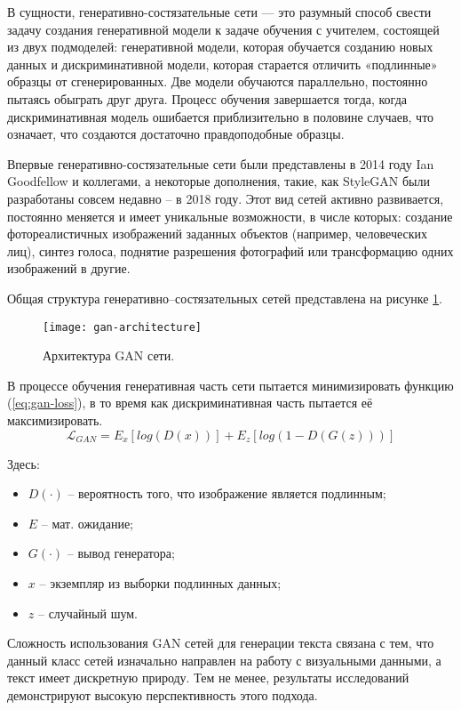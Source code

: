 В сущности, генеративно-состязательные сети --- это разумный способ свести задачу создания генеративной модели к задаче обучения с учителем, состоящей из двух подмоделей: генеративной модели, которая обучается созданию новых данных и дискриминативной модели, которая старается отличить «подлинные» образцы от сгенерированных. Две модели обучаются параллельно, постоянно пытаясь обыграть друг друга. Процесс обучения завершается тогда, когда дискриминативная модель ошибается приблизительно в половине случаев, что означает, что создаются достаточно правдоподобные образцы.

Впервые генеративно-состязательные сети были представлены в 2014 году Ian Goodfellow и коллегами\cite{gan-introduction}, а некоторые дополнения, такие, как StyleGAN были разработаны совсем недавно -- в 2018 году\cite{gan-stylegan}. Этот вид сетей активно развивается, постоянно меняется и имеет уникальные возможности, в числе которых: создание фотореалистичных изображений заданных объектов (например, человеческих лиц), синтез голоса, поднятие разрешения фотографий\cite{gan-upscaling} или трансформацию одних изображений в другие.

Общая структура генеративно--состязательных сетей представлена на рисунке \ref{fig:gan-architecture}.
\begin{figure}[h]
	\centering
	\texttt{[image: gan-architecture]}
	\caption{Архитектура GAN сети.}
	\label{fig:gan-architecture}
\end{figure}

В процессе обучения генеративная часть сети пытается минимизировать функцию (\ref{eq:gan-loss}), в то время как дискриминативная часть пытается её максимизировать. 
\begin{equation}
\label{eq:gan-loss}
\mathcal{L}_{GAN} = E_x[log(D(x))] + E_z[log(1 - D(G(z)))]
\end{equation}

Здесь:
\begin{itemize}
	\item $D(\cdot)$ -- вероятность того, что изображение является подлинным;
	\item $E$ -- мат. ожидание;
	\item $G(\cdot)$ -- вывод генератора;
	\item $x$ -- экземпляр из выборки подлинных данных;
	\item $z$ -- случайный шум.
\end{itemize}

Сложность использования GAN сетей для генерации текста связана с тем, что данный класс сетей изначально направлен на работу с визуальными данными, а текст имеет дискретную природу. Тем не менее, результаты исследований\cite{zhang2017adversarial} демонстрируют высокую перспективность этого подхода.

